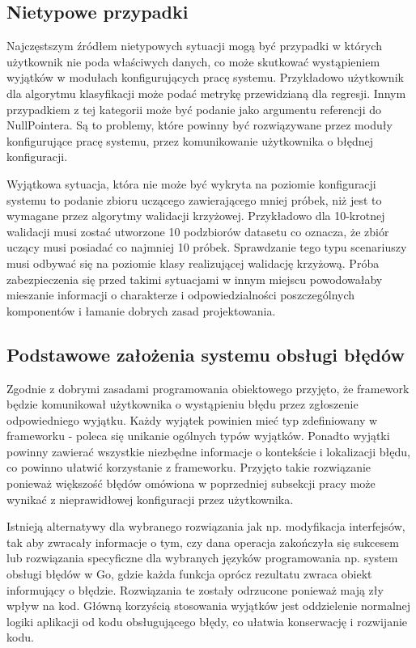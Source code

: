 \documentclass[12pt]{article}
\begin{document}
\subsection{Nietypowe przypadki}

Najczęstszym źródłem nietypowych sytuacji mogą być przypadki w których użytkownik nie poda właściwych danych, co może skutkować wystąpieniem wyjątków w modułach konfigurujących pracę systemu. Przykładowo użytkownik dla algorytmu klasyfikacji może podać metrykę przewidzianą dla regresji. Innym przypadkiem z tej kategorii może być podanie jako argumentu referencji do NullPointera. Są to problemy, które powinny być rozwiązywane przez moduły konfigurujące pracę systemu, przez komunikowanie użytkownika o błędnej konfiguracji.
 
Wyjątkowa sytuacja, która nie może być wykryta na poziomie konfiguracji systemu to podanie zbioru uczącego zawierającego mniej próbek, niż jest to wymagane przez algorytmy walidacji krzyżowej. Przykładowo dla 10-krotnej walidacji musi zostać utworzone 10 podzbiorów datasetu co oznacza, że zbiór uczący musi posiadać co najmniej 10 próbek. Sprawdzanie tego typu scenariuszy musi odbywać się na poziomie klasy realizującej walidację krzyżową. Próba zabezpieczenia się przed takimi sytuacjami w innym miejscu powodowałaby mieszanie informacji o charakterze i odpowiedzialności poszczególnych komponentów i łamanie dobrych zasad projektowania.

\subsection{Podstawowe założenia systemu obsługi błędów}

Zgodnie z dobrymi zasadami programowania obiektowego \cite{clean-code} przyjęto, że framework będzie komunikował użytkownika o wystąpieniu błędu przez zgłoszenie odpowiedniego wyjątku. Każdy wyjątek powinien mieć typ zdefiniowany w frameworku - poleca się unikanie ogólnych typów wyjątków. Ponadto wyjątki powinny zawierać wszystkie niezbędne informacje o kontekście i lokalizacji błędu, co powinno ułatwić korzystanie z frameworku. Przyjęto takie rozwiązanie ponieważ większość błędów omówiona w poprzedniej subsekcji pracy może wynikać z nieprawidłowej konfiguracji przez użytkownika. 

Istnieją alternatywy dla wybranego rozwiązania jak np. modyfikacja interfejsów, tak aby zwracały informacje o tym, czy dana operacja zakończyła się sukcesem lub rozwiązania specyficzne dla wybranych języków programowania np. system obsługi błędów w Go, gdzie każda funkcja oprócz rezultatu zwraca obiekt informujący o błędzie. Rozwiązania te zostały odrzucone ponieważ mają zły wpływ na kod. Główną korzyścią stosowania wyjątków jest oddzielenie normalnej logiki aplikacji od kodu obsługującego błędy, co ułatwia konserwację i rozwijanie kodu. 
\end{document}
